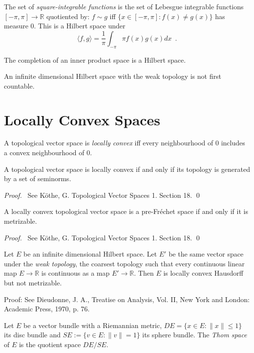 \begin{ex}
The set of \emph{square-integrable functions} is the set of Lebesgue integrable functions $[-\pi,\pi] \rightarrow \mathbb{R}$ quotiented by: $f \sim g$ iff $\{ x \in [-\pi,\pi] : f(x) \neq g(x) \}$ has measure 0. This is a Hilbert space under
\[ \langle f,g \rangle = \frac{1}{\pi} \int_{- \pi}{\pi} f(x) g(x) dx \enspace . \]
\end{ex}

\begin{prop}
The completion of an inner product space is a Hilbert space.
\end{prop}

An infinite dimensional Hilbert space with the weak topology is not first countable.

\section{Locally Convex Spaces}

\begin{df}
A topological vector space is \emph{locally convex} iff every neighbourhood of 0 includes a convex neighbourhood of 0.
\end{df}

\begin{prop}
A topological vector space is locally convex if and only if its topology is generated by a set of seminorms.
\end{prop}

\begin{proof}
\pf\ See K\"{o}the, G. Topological Vector Spaces 1. Section 18. \qed
\end{proof}

\begin{prop}
A locally convex topological vector space is a pre-Fr\'{e}chet space if and only if it is metrizable.
\end{prop}

\begin{proof}
\pf\ See K\"{o}the, G. Topological Vector Spaces 1. Section 18. \qed
\end{proof}

\begin{ex}
Let $E$ be an infinite dimensional Hilbert space. Let $E'$ be the same vector space under the \emph{weak topology}, the coarsest topology such that every continuous linear map $E \rightarrow \mathbb{R}$ is continuous as a map $E' \rightarrow \mathbb{R}$. Then $E$ is locally convex Hausdorff but not metrizable.

Proof: See Dieudonne, J. A., Treatise on Analysis, Vol. II, New York and London: Academic Press, 1970, p. 76.
\end{ex}

\begin{df}
Let $E$ be a vector bundle with a Riemannian metric, $DE = \{ x \in E : \| x \| \leq 1 \}$ its disc bundle and $SE := \{ v \in E : \| v \| = 1 \}$ its sphere bundle. The \emph{Thom space} of $E$ is the quotient space $DE / SE$.
\end{df}
